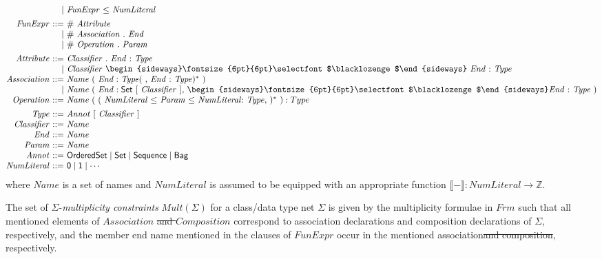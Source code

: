\documentclass[10pt,fleqn,final]{scrreprt}
\newcommand{\composition}{\raisebox{0.2pt}{\begin{sideways}\fontsize{6pt}{6pt}\selectfont$\blacklozenge$\end{sideways}}}
\newcommand{\NZ}{\mathbb{Z}}
\newcommand{\sem}[1]{\mathopen\llbracket#1\mathclose\rrbracket}
\providecommand{\DIFdel}[1]{{\protect\color{red}\sout{#1}}}                      %
\providecommand{\DIFaddend}{} %
\providecommand{\DIFdelbegin}{} %
\providecommand{\DIFdelend}{} %
\begin{document}
\begin{equation*}
{\begin{array}{@{}r@{\ }r@{\ }l@{}}
               &   | & \mathit{FunExpr}\ \mathsf{\leq}\ \mathit{NumLiteral}
\\[1ex]
  \mathit{FunExpr} & ::= & \mathit{\#}\ \mathit{Attribute}\\
                   &   | & \mathit{\#}\ \mathit{Association}\ \mathsf{.}\ \mathit{End}\\
                   &   | & \mathit{\#}\ \mathit{Operation}\ \mathsf{.}\ \mathit{Param}
\\[1ex]
  \mathit{Attribute} & ::= & \mathit{Classifier}\ \mathsf{.}\ \mathit{End}\ \mathsf{:}\ \mathit{Type}\\
                     &   | & \mathit{Classifier}\ \composition\ \mathit{End}\ \mathsf{:}\ \mathit{Type}
\\
  \mathit{Association} & ::= & \mathit{Name}\ (\ \mathit{End} : \mathit{Type}(\ \mathsf{,}\ \mathit{End}\ \mathsf{:}\ \mathit{Type})^*\ )\\
                       &   | & \mathit{Name}\ (\ \mathit{End} : \mathsf{Set}\ [\ \mathit{Classifier}\ ]\mathsf{,}\ \composition \mathit{End}\ \mathsf{:}\ \mathit{Type}\ )
\\
  \mathit{Operation} & ::= & \mathit{Name}\ (\  (\  \mathit{NumLiteral}\ \mathsf{\leq}\ \mathit{Param}\  \mathsf{\leq}\ \mathit{NumLiteral} \mathsf{:}\ \mathit{Type} \mathsf{,}\ )^*\ ) : Type
\\[1ex]
  \mathit{Type} & ::= & \mathit{Annot}\ \mathsf{[}\ \mathit{Classifier}\ \mathsf{]}
\\
  \mathit{Classifier} & ::= & \mathit{Name}
\\
  \mathit{End} & ::= & \mathit{Name}
\\
  \mathit{Param} & ::= & \mathit{Name}
\\
  \mathit{Annot} & ::= & \mathsf{OrderedSet} \mid \mathsf{Set} \mid \mathsf{Sequence} \mid \mathsf{Bag}
\\
  \mathit{NumLiteral} & ::= & \mathsf{0} \mid \mathsf{1} \mid \cdots
\end{array}
}\DIFaddend \end{equation*}
%
where $\mathit{Name}$ is a set of names and $\mathit{NumLiteral}$ is
assumed to be equipped with an appropriate function
$\sem{-} : \mathit{NumLiteral} \to \NZ$.

The set of $\Sigma$-\emph{multiplicity
  constraints} $\mathit{Mult}(\Sigma)$
for a class/data type net $\Sigma$
is given by the multiplicity formulae in $\mathit{Frm}$
such that all mentioned elements of $\mathit{Association}$
\DIFdelbegin \DIFdel{and $\mathit{Composition}$ }\DIFdelend correspond to association declarations and composition declarations of
$\Sigma$,
respectively, and the member end name mentioned in the clauses of
$\mathit{FunExpr}$ occur in the mentioned association\DIFdelbegin \DIFdel{and composition}\DIFdelend , respectively.
\end{document}
